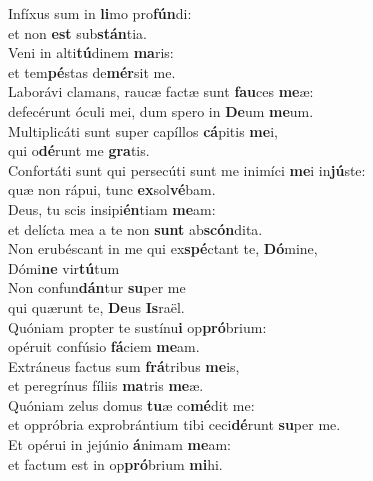 \evenverse Infíxus sum in \textbf{li}mo pro\textbf{fún}di:~\*\\
\evenverse et non \textbf{est} sub\textbf{stán}tia.\\
\oddverse Veni in alti\textbf{tú}dinem \textbf{ma}ris:~\*\\
\oddverse et tem\textbf{pé}stas de\textbf{mér}sit me.\\
\evenverse Laborávi clamans, raucæ factæ sunt \textbf{fau}ces \textbf{me}æ:~\*\\
\evenverse defecérunt óculi mei, dum spero in \textbf{De}um \textbf{me}um.\\
\oddverse Multiplicáti sunt super capíllos \textbf{cá}pitis \textbf{me}i,~\*\\
\oddverse qui o\textbf{dé}runt me \textbf{gra}tis.\\
\evenverse Confortáti sunt qui persecúti sunt me inimíci \textbf{me}i in\textbf{jú}ste:~\*\\
\evenverse quæ non rápui, tunc \textbf{ex}sol\textbf{vé}bam.\\
\oddverse Deus, tu scis insipi\textbf{én}tiam \textbf{me}am:~\*\\
\oddverse et delícta mea a te non \textbf{sunt} ab\textbf{scón}dita.\\
\evenverse Non erubéscant in me qui ex\textbf{spé}ctant te, \textbf{Dó}mine,~\*\\
\evenverse Dómi\textbf{ne} vir\textbf{tú}tum\\
\oddverse Non confun\textbf{dán}tur \textbf{su}per me~\*\\
\oddverse qui quærunt te, \textbf{De}us \textbf{Is}raël.\\
\evenverse Quóniam propter te sustínu\textbf{i} op\textbf{pró}brium:~\*\\
\evenverse opéruit confúsio \textbf{fá}ciem \textbf{me}am.\\
\oddverse Extráneus factus sum \textbf{frá}tribus \textbf{me}is,~\*\\
\oddverse et peregrínus fíliis \textbf{ma}tris \textbf{me}æ.\\
\evenverse Quóniam zelus domus \textbf{tu}æ co\textbf{mé}dit me:~\*\\
\evenverse et oppróbria exprobrántium tibi ceci\textbf{dé}runt \textbf{su}per me.\\
\oddverse Et opérui in jejúnio \textbf{á}nimam \textbf{me}am:~\*\\
\oddverse et factum est in op\textbf{pró}brium \textbf{mi}hi.\\
